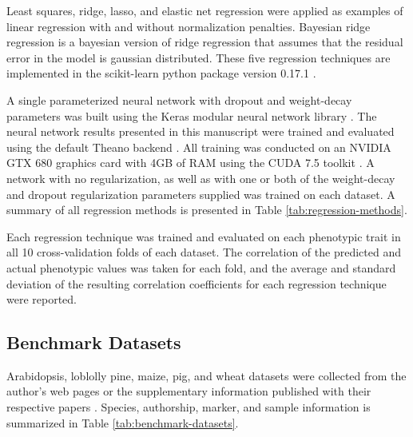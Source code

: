 Least squares, ridge, lasso, and elastic net regression were applied as examples of
linear regression with and without normalization penalties. Bayesian 
ridge regression is a bayesian version of ridge regression that assumes that 
the residual error in the model is gaussian distributed. These five regression 
techniques are implemented in the scikit-learn python package version 0.17.1 \citep{scikit-learn}.

A single parameterized neural network with dropout and weight-decay parameters was built using 
the Keras modular neural network library \citep{chollet2015}. The neural network results presented in this
manuscript were trained and evaluated using the default Theano backend \citep{team2016}. 
All training was conducted on an NVIDIA GTX 680 graphics card with 4GB 
of RAM using the CUDA 7.5 toolkit \citep{nickolls2008}. A network with no regularization,
as well as with one or both of the weight-decay and dropout regularization parameters
supplied was trained on each dataset. A summary of all regression methods is presented in Table \ref{tab:regression-methods}.

\ifdefined\showtablesandfigures
\fi

Each regression technique was trained and evaluated on each phenotypic trait in all 10 cross-validation folds of each dataset.
The correlation of the predicted and actual phenotypic values was taken for each fold, and the average and 
standard deviation of the resulting correlation coefficients for each regression technique were reported.


\subsection*{Benchmark Datasets}

Arabidopsis, loblolly pine, maize, pig, and wheat datasets were collected from the author's web pages
or the supplementary information published with their respective papers \citep{loudet2002, resende2012, crossa2010, cleveland2012, thavamanikumar2015}.
Species, authorship, marker, and sample information is summarized in Table \ref{tab:benchmark-datasets}.


